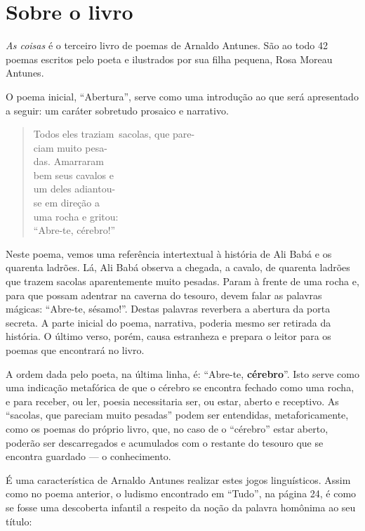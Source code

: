 \documentclass[11pt]{extarticle}
\begin{document}
\section{Sobre o livro}

\textit{As coisas} é o terceiro livro de poemas de Arnaldo Antunes. 
São ao todo 42 poemas escritos pelo poeta e ilustrados por sua filha
pequena, Rosa Moreau Antunes. 

O poema inicial, ``Abertura'', serve como uma introdução ao que será
apresentado a seguir: um caráter sobretudo prosaico e narrativo.

\begin{verse}
Todos eles traziam\
sacolas, que pare-\\
ciam muito pesa-\\
das. Amarraram\\
bem seus cavalos e\\
um deles adiantou-\\
se em direção a\\
uma rocha e gritou:\\
``Abre-te, cérebro!''\\
\end{verse}

Neste poema, vemos uma referência intertextual à história de Ali Babá 
e os quarenta ladrões. Lá, Ali Babá observa a chegada, a cavalo, de
quarenta ladrões que trazem sacolas aparentemente muito pesadas. 
Param à frente de uma rocha e, para que possam adentrar na caverna do tesouro, 
devem falar as palavras mágicas: ``Abre-te, sésamo!''. Destas palavras
reverbera a abertura da porta secreta. A parte inicial do poema, narrativa, 
poderia mesmo ser retirada da história. O último verso, porém, causa 
estranheza e prepara o leitor para os poemas que encontrará no livro.

A ordem dada pelo poeta, na última linha, é: ``Abre-te, \textbf{cérebro}''. Isto serve como
uma indicação metafórica de que o cérebro se encontra fechado como uma rocha, e para
receber, ou ler, poesia necessitaria ser, ou estar, aberto e receptivo.
As ``sacolas, que pareciam muito pesadas'' podem ser entendidas, metaforicamente, como os 
poemas do próprio livro, que, no caso de o ``cérebro'' estar aberto, poderão ser descarregados e
acumulados com o restante do tesouro que se encontra guardado --- o conhecimento. 

É uma característica de Arnaldo Antunes realizar estes jogos linguísticos. 
Assim como no
poema anterior, o ludismo encontrado em ``Tudo'', na página 24, é como se fosse uma
descoberta infantil a respeito da noção da palavra homônima ao seu título:
\end{document}
